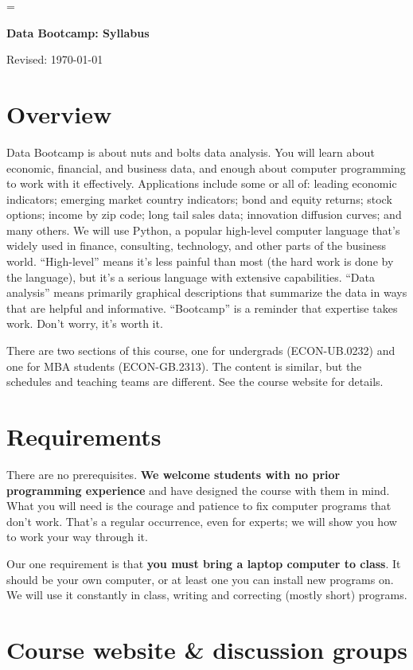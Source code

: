 \documentclass[11pt]{article}
\begin{document}
\parskip=\bigskipamount
\parindent=0.0in
\thispagestyle{empty}


\bigskip\bigskip
\centerline{\Large \bf Data Bootcamp:  Syllabus}
\centerline{Revised: \today}


\section*{Overview}

Data Bootcamp is about nuts and bolts data analysis. You will learn about economic, financial, and business
data, and enough about computer programming to work with it effectively.
Applications include some or all of: leading economic indicators; emerging market country indicators;
bond and equity returns; stock options; income by zip code; long tail sales data; innovation diffusion curves; and many others.
We will use Python, a popular high-level computer language that's widely used in finance, consulting,
technology, and other parts of the business world.
``High-level'' means it's less painful than most (the hard work is done by the language),
but it's a serious language with extensive capabilities.
``Data analysis'' means primarily graphical descriptions that summarize the data
in ways that are helpful and informative.
``Bootcamp'' is a reminder that expertise takes work. Don't worry, it's worth it.

There are two sections of this course,
one for undergrads (ECON-UB.0232) and one for MBA students (ECON-GB.2313).
The content is similar, but the schedules and teaching teams are different.
See the course website for details.


\section*{Requirements}

There are no prerequisites.
{\bf We welcome students with no prior programming experience\/} 
and have designed the course with them in mind.
What you will need is the courage and patience to fix computer programs that don't work.
That's a regular occurrence, even for experts;
we will show you how to work your way through it.

Our one requirement is that {\bf you must bring a laptop computer to class\/}.
It should be your own computer, or at least one you can install new programs on.
We will use it constantly in class, writing and correcting (mostly short) programs.


\section*{Course website \& discussion groups}
\end{document}
